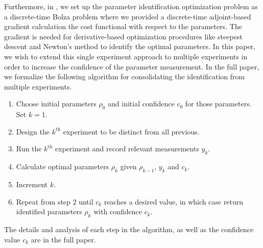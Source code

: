 \documentclass[runningheads,a4paper]{llncs}
\begin{document}
Furthermore, in \cite{caldwell_coleman_correll}, we set up the parameter identification optimization problem as a discrete-time Bolza problem where we provided a discrete-time adjoint-based gradient calculation the cost functional with respect to the parameters.  The gradient is needed for derivative-based optimization procedures like steepest descent and Newton's method to identify the optimal parameters.  In this paper, we wish to extend this single experiment approach to multiple experiments in order to increase the confidence of the parameter measurement.  In the full paper, we formalize the following algorithm for consolidating the identification from multiple experiments.  
\begin{enumerate}
\item Choose initial parameters $\rho_0$ and initial confidence $c_0$ for those parameters.  Set $k = 1$.
\item Design the $k^\textrm{th}$ experiment to be distinct from all previous.
\item Run the $k^\textrm{th}$ experiment and record relevant measurements $y_{k}$.
\item Calculate optimal parameters $\rho_k$ given $\rho_{k-1}$, $y_{k}$ and $c_k$.
\item Increment $k$.
\item Repeat from step 2 until $c_k$ reaches a desired value, in which case return identified parameters $\rho_{k}$ with confidence $c_k$.
\end{enumerate}
The details and analysis of each step in the algorithm, as well as the confidence value $c_k$ are in the full paper.  
\end{document}
